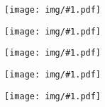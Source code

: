 \documentclass[11pt]{report}
\newcommand{\figura}[1] {
    \begin{figure}[!htbp]
      \begin{center}
        \texttt{[image: img/\#1.pdf]}
      \end{center}
    \end{figure}
}
\newcommand{\quadrinhos}[1] {
    \figura{quad#1}
}
\begin{document}
\renewcommand{\contentsname}{\center Esse guia contém...}

\figura{Capa}
\clearpage
\pagebreak

\tableofcontents
\newpage


\pagebreak


\pagebreak
\quadrinhos{1}




\quadrinhos{2}




\quadrinhos{6}


\quadrinhos{7}
\pagebreak %












\pagebreak


\pagebreak
\end{document}
